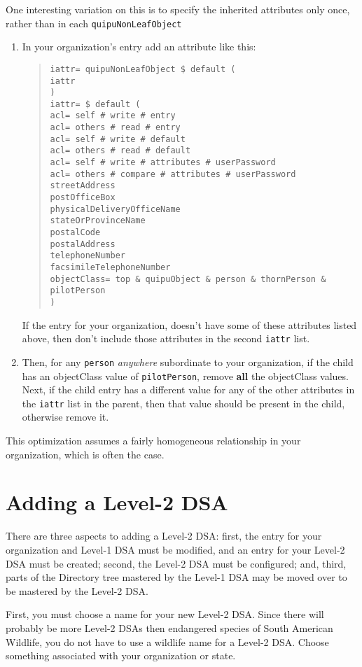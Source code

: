 One interesting variation on this is to specify the inherited attributes only
once, rather than in each \verb"quipuNonLeafObject"
\begin{enumerate}
\item	In your organization's entry add an attribute like this:
\begin{quote}\smaller\begin{verbatim}
iattr= quipuNonLeafObject $ default (
iattr
)
iattr= $ default (
acl= self # write # entry
acl= others # read # entry
acl= self # write # default
acl= others # read # default
acl= self # write # attributes # userPassword
acl= others # compare # attributes # userPassword
streetAddress
postOfficeBox
physicalDeliveryOfficeName
stateOrProvinceName
postalCode
postalAddress
telephoneNumber
facsimileTelephoneNumber
objectClass= top & quipuObject & person & thornPerson & pilotPerson
)
\end{verbatim}\end{quote}
If the entry for your organization,
doesn't have some of these attributes listed above,
then don't include those attributes in the second \verb"iattr" list.

\item	Then, for any \verb"person" {\em anywhere\/} subordinate to your
organization,
if the child has an objectClass value of \verb"pilotPerson",
remove {\bf all\/} the objectClass values.
Next,
if the child entry has a different value for any of the other attributes in
the \verb"iattr" list in the parent,
then that value should be present in the child,
otherwise remove it.  
\end{enumerate}
This optimization assumes a fairly homogeneous relationship in your
organization, which is often the case.

\section	{Adding a Level-2 DSA}
There are three aspects to adding a Level-2 DSA:
first, the entry for your organization and Level-1 DSA must be modified,
and an entry for your Level-2 DSA must be created;
second,
the Level-2 DSA must be configured;
and,
third,
parts of the Directory tree mastered by the Level-1 DSA may be moved over to
be mastered by the Level-2 DSA.

First, you must choose a name for your new Level-2 DSA.
Since there will probably be more Level-2 DSAs then endangered species of
South American Wildlife,
you do not have to use a wildlife name for a Level-2 DSA.
Choose something associated with your organization or state.

